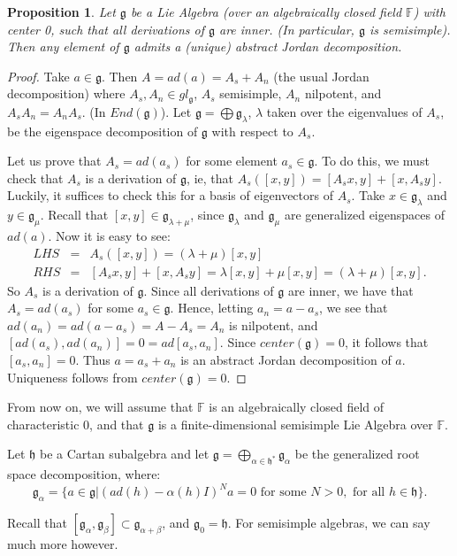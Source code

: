 \documentclass[12pt]{amsart}
\newtheorem*{prop}{Proposition}
\theoremstyle{definition}
\theoremstyle{definition}
\theoremstyle{definition}
\numberwithin{equation}{subsection}
\newcommand{\g}{\mathfrak{g}}
\newcommand{\h}{\mathfrak{h}}
\begin{document}
\begin{prop}
Let $\g$ be a Lie Algebra (over an algebraically closed field $\mathbb{F}$) with center 0, such that
all derivations of $\g$ are inner. (In particular, $\g$ is semisimple). Then any element of
$\g$ admits a (unique) abstract Jordan decomposition.
\end{prop}
\begin{proof}
Take $a \in \g$. Then $A = ad(a) = A_s + A_n$ (the usual Jordan decomposition) where 
$A_s,A_n \in gl_{\g}$, $A_s$ semisimple, $A_n$ nilpotent, and $A_s A_n = A_n A_s$.
(In $End(\g)$). Let $\g = \bigoplus{\g_{\lambda}}$, $\lambda$ taken over the
eigenvalues of $A_s$, be the eigenspace decomposition of $\g$ with respect to $A_s$.

Let us prove that $A_s = ad(a_s)$ for some element $a_s \in \g$. To do this, we must check that
$A_s$ is a derivation of $\g$, ie, that $A_s([x,y]) = [A_s x, y] + [x, A_s y]$. Luckily,
it suffices to check this for a basis of eigenvectors of $A_s$. Take $x \in \g_{\lambda}$ and
$y \in \g_{\mu}$. Recall that $[x,y] \in \g_{\lambda + \mu}$, since
$\g_{\lambda}$ and $\g_{\mu}$ are generalized eigenspaces of $ad(a)$. Now it is easy to see:
\begin{eqnarray*}
LHS &=& A_s([x,y]) = (\lambda + \mu)[x,y]\\
RHS &=& [A_s x, y] + [x, A_s y] = \lambda [x,y] + \mu [x,y] = 
  (\lambda + \mu)[x,y].
\end{eqnarray*}
So $A_s$ is a derivation of $\g$. Since all derivations of $\g$ are inner,
we have that $A_s = ad(a_s)$ for some $a_s \in \g$. Hence, letting $a_n = a - a_s$,
we see that $ad(a_n) = ad(a - a_s) = A - A_s = A_n$ is nilpotent, and $[ad(a_s),ad(a_n)] = 0 = ad[a_s,a_n]$.
Since $center(\g)=0$, it follows that $[a_s,a_n]=0$. Thus $a = a_s + a_n$ is an abstract Jordan decomposition
of $a$. Uniqueness follows from $center(\g) = 0$.
\end{proof}

From now on, we will assume that $\mathbb{F}$ is an algebraically closed field of characteristic 0,
and that $\g$ is a finite-dimensional semisimple Lie Algebra over $\mathbb{F}$.

Let $\h$ be a Cartan subalgebra and let $\g = \bigoplus_{\alpha \in \h^*}{\g_\alpha}$ be
the generalized root space decomposition, where: 
$$\g_\alpha = \{ a \in \g | (ad(h) - \alpha(h) I)^N a = 0 \textrm{ for some } N>0, \textrm{ for all } h \in \h\}.$$

Recall that $[\g_\alpha, \g_\beta] \subset \g_{\alpha + \beta}$, and $\g_0 = \h$.
For semisimple algebras, we can say much more however.
\end{document}
